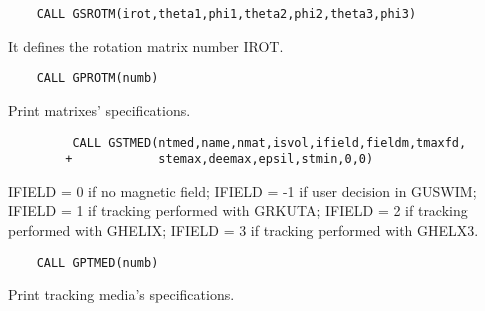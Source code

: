 \begin{verbatim}
    CALL GSROTM(irot,theta1,phi1,theta2,phi2,theta3,phi3)
\end{verbatim}
   \par
It defines the rotation matrix number IROT.  

\ENDCMD


\BEGARG
{}
\ENDARG

\begin{verbatim}
    CALL GPROTM(numb)
\end{verbatim}
   \par
Print matrixes' specifications.  

\ENDCMD


\BEGARG
{}
\ENDARG

\begin{verbatim}
         CALL GSTMED(ntmed,name,nmat,isvol,ifield,fieldm,tmaxfd,
        +            stemax,deemax,epsil,stmin,0,0)
\end{verbatim}
   \par
IFIELD = 0 if no magnetic field; IFIELD = -1 if user decision in GUSWIM; 
   IFIELD = 1 if tracking performed with GRKUTA; IFIELD = 2 if tracking 
   performed with GHELIX; IFIELD = 3 if tracking performed with GHELX3.  

\ENDCMD


\BEGARG
{}
\ENDARG

\begin{verbatim}
    CALL GPTMED(numb)
\end{verbatim}
   \par
Print tracking media's specifications.  


